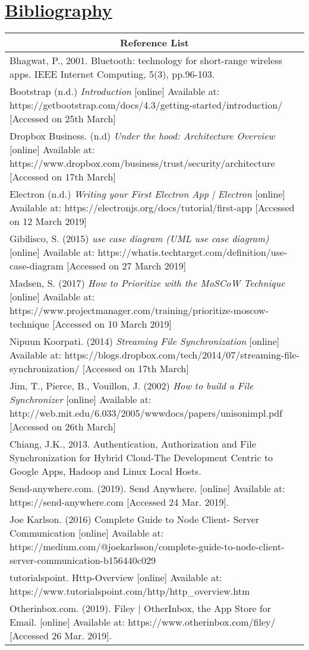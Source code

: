 \documentclass{article}
\begin{document}
\section{\underline{Bibliography}}
\begin{tabular}{|p{12.2cm}|}
\hline
\multicolumn{1}{|c|}{\textbf{Reference List}} \\
\hline
Bhagwat, P., 2001. Bluetooth: technology for short-range wireless apps. IEEE Internet Computing, 5(3), pp.96-103. \\
\hline
Bootstrap (n.d.) \textit{Introduction} [online] Available at: https://getbootstrap.com/docs/4.3/getting-started/introduction/ [Accessed on 25th March] \\
\hline
Dropbox Business. (n.d) \textit{Under the hood: Architecture Overview} [online] Available at: https://www.dropbox.com/business/trust/security/architecture [Accessed on 17th March] \\
\hline
Electron (n.d.) \textit{Writing your First Electron App | Electron} [online] Available at: https://electronjs.org/docs/tutorial/first-app [Accessed on 12 March 2019] \\
\hline
Gibilisco, S. (2015) \textit{use case diagram (UML use case diagram)} [online] Available at: https://whatis.techtarget.com/definition/use-case-diagram [Accessed on 27 March 2019]\\
\hline
Madsen, S. (2017) \textit{How to Prioritize with the MoSCoW Technique} [online] Available at: https://www.projectmanager.com/training/prioritize-moscow-technique [Accessed on 10 March 2019] \\
\hline
Nipuun Koorpati. (2014) \textit{Streaming File Synchronization } [online] Available at: https://blogs.dropbox.com/tech/2014/07/streaming-file-synchronization/ [Accessed on 17th March] \\
\hline
Jim, T., Pierce, B., Vouillon, J.  (2002) \textit{How to build a File Synchronizer} [online] Available at: http://web.mit.edu/6.033/2005/wwwdocs/papers/unisonimpl.pdf [Accessed on 26th March] \\
\hline
Chiang, J.K., 2013. Authentication, Authorization and File Synchronization for Hybrid Cloud-The Development Centric to Google Apps, Hadoop and Linux Local Hosts. \\
\hline
Send-anywhere.com. (2019). Send Anywhere. [online] Available at: https://send-anywhere.com [Accessed 24 Mar. 2019]. \\
\hline
Joe Karlson. (2016) Complete Guide to Node Client- Server Communication [online] Available at: https://medium.com/@joekarlsson/complete-guide-to-node-client-server-communication-b156440c029 \\
\hline
tutorialspoint. Http-Overview [online] Available at: https://www.tutorialspoint.com/http/http\_overview.htm \\
\hline
Otherinbox.com. (2019). Filey | OtherInbox, the App Store for Email. [online] Available at: https://www.otherinbox.com/filey/ [Accessed 26 Mar. 2019]. \\
\hline
\end{tabular}
\end{document}
